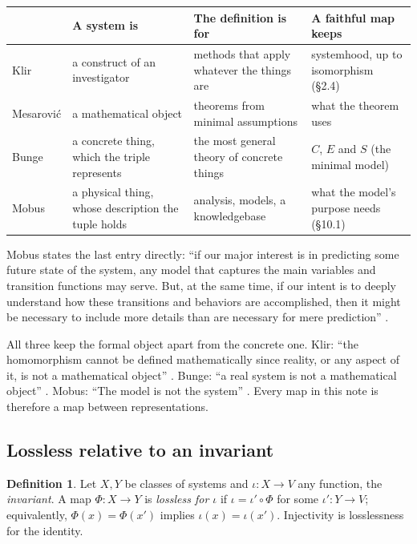 \documentclass[11pt]{article}
\theoremstyle{definition}
\newtheorem{definition}[theorem]{Definition}
\theoremstyle{remark}
\begin{document}
\begin{center}
\renewcommand{\arraystretch}{1.25}
\begin{tabular}{@{}l>{\raggedright\arraybackslash}p{3.2cm}>{\raggedright\arraybackslash}p{4.0cm}>{\raggedright\arraybackslash}p{3.6cm}@{}}
\toprule
 & A system is & The definition is for & A faithful map keeps\\
\midrule
Klir & a construct of an investigator & methods that apply whatever the things are & systemhood, up to isomorphism (\S2.4)\\
Mesarovi\'c & a mathematical object & theorems from minimal assumptions & what the theorem uses\\
Bunge & a concrete thing, which the triple represents & the most general theory of concrete things & $C$, $E$ and $S$ (the minimal model)\\
Mobus & a physical thing, whose description the tuple holds & analysis, models, a knowledgebase & what the model's purpose needs (\S10.1)\\
\bottomrule
\end{tabular}
\end{center}

Mobus states the last entry directly: ``if our major interest is in predicting some future state of the system, any model that captures the main variables and transition functions may serve. But, at the same time, if our intent is to deeply understand how these transitions and behaviors are accomplished, then it might be necessary to include more details than are necessary for mere prediction'' \cite[\S10.1]{mobus2022}.

All three keep the formal object apart from the concrete one. Klir: ``the homomorphism cannot be defined mathematically since reality, or any aspect of it, is not a mathematical object'' \cite[\S5.3]{klir2001}. Bunge: ``a real system is not a mathematical object'' \cite[Ch.~6 \S1]{bunge1974b}. Mobus: ``The model is not the system'' \cite[\S8.4]{mobus2022}. Every map in this note is therefore a map between representations.

\subsection{Lossless relative to an invariant}

\begin{definition}
Let $X,Y$ be classes of systems and $\iota:X\to V$ any function, the \emph{invariant}. A map $\Phi:X\to Y$ is \emph{lossless for $\iota$} if $\iota=\iota'\circ\Phi$ for some $\iota':Y\to V$; equivalently, $\Phi(x)=\Phi(x')$ implies $\iota(x)=\iota(x')$. Injectivity is losslessness for the identity.
\end{definition}
\end{document}
